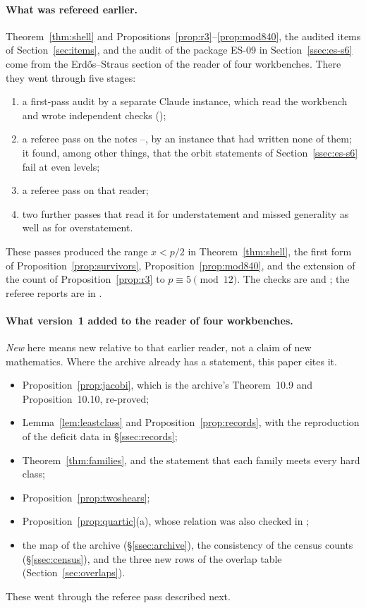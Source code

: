 \paragraph{What was refereed earlier.}
Theorem~\ref{thm:shell} and Propositions~\ref{prop:r3}--\ref{prop:mod840}, the audited items of Section~\ref{sec:items}, and the audit of the package ES-09 in Section~\ref{ssec:es-s6} come from the Erdős--Straus section of the reader of four workbenches. There they went through five stages:
\begin{enumerate}[label=\arabic*.]
\item a first-pass audit by a separate Claude instance, which read the workbench and wrote independent checks ();
\item a referee pass on the notes --, by an instance that had written none of them; it found, among other things, that the orbit statements of Section~\ref{ssec:es-s6} fail at even levels;
\item a referee pass on that reader;
\item two further passes that read it for understatement and missed generality as well as for overstatement.
\end{enumerate}
These passes produced the range $x<p/2$ in Theorem~\ref{thm:shell}, the first form of Proposition~\ref{prop:survivors}, Proposition~\ref{prop:mod840}, and the extension of the count of Proposition~\ref{prop:r3} to $p\equiv5\pmod{12}$. The checks are  and ; the referee reports are in .

\paragraph{What version~1 added to the reader of four workbenches.}
\emph{New} here means new relative to that earlier reader, not a claim of new mathematics. Where the archive already has a statement, this paper cites it.
\begin{itemize}
\item Proposition~\ref{prop:jacobi}, which is the archive's Theorem~10.9 and Proposition~10.10, re-proved;
\item Lemma~\ref{lem:leastclass} and Proposition~\ref{prop:records}, with the reproduction of the deficit data in §\ref{ssec:records};
\item Theorem~\ref{thm:families}, and the statement that each family meets every hard class;
\item Proposition~\ref{prop:twoshears};
\item Proposition~\ref{prop:quartic}(a), whose relation was also checked in ;
\item the map of the archive (§\ref{ssec:archive}), the consistency of the census counts (§\ref{ssec:census}), and the three new rows of the overlap table (Section~\ref{sec:overlaps}).
\end{itemize}
These went through the referee pass described next.

